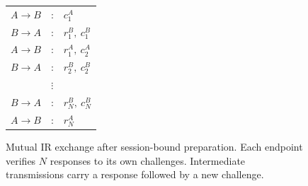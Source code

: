 \documentclass[sigconf,authordraft]{acmart}
\begin{document}
\begin{figure}[t]
    \centering
    \begin{tabular}{@{}rcl@{}}
        $A\rightarrow B$ & : & $c^A_1$ \\
        $B\rightarrow A$ & : & $r^B_1,\ c^B_1$ \\
        $A\rightarrow B$ & : & $r^A_1,\ c^A_2$ \\
        $B\rightarrow A$ & : & $r^B_2,\ c^B_2$ \\
        & $\vdots$ & \\
        $B\rightarrow A$ & : & $r^B_N,\ c^B_N$ \\
        $A\rightarrow B$ & : & $r^A_N$
    \end{tabular}
    \caption{Mutual IR exchange after session-bound preparation. Each endpoint verifies $N$ responses to its own challenges. Intermediate transmissions carry a response followed by a new challenge.}
    \label{fig:ir-mutual-exchange}
\end{figure}


\end{document}
